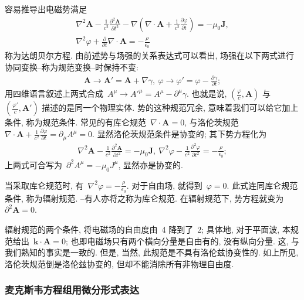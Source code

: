 容易推导出电磁势满足
\begin{gather}
\nabla^2\bm{A}-\frac{1}{c^2}\frac{\partial^2\bm{A}}{\partial t^2}-\nabla\left(\nabla\cdot\bm{A}+\frac{1}{c^2}\frac{\partial\varphi}{\partial t}\right)=-\mu_0\bm{J},\\
\nabla^2\varphi+\frac{\partial}{\partial t}\nabla\cdot\bm{A}=-\frac{\rho}{\epsilon_0}
\end{gather}
称为达朗贝尔方程. 由前述势与场强的关系表达式可以看出, 场强在以下两式进行协同变换--称为规范变换--时保持不变:
\begin{gather}
\bm{A}\rightarrow\bm{A}'=\bm{A}+\nabla\gamma,~\varphi\rightarrow\varphi'=\varphi-\frac{\partial\gamma}{\partial t};
\end{gather}
用四维语言叙述上两式合成~$A^\mu\rightarrow A'^\mu=A^\mu-\partial^\mu\gamma$. 也就是说, $(\frac{\varphi}{c},\bm{A})$ 与~$(\frac{\varphi'}{c},\bm{A}')$ 描述的是同一个物理实体. 势的这种规范冗余, 意味着我们可以给它加上条件, 称为规范条件. 常见的有库仑规范~$\nabla\cdot\bm{A}=0$, 与洛伦茨规范~$\nabla\cdot\bm{A}+\frac{1}{c^2}\frac{\partial\varphi}{\partial t}=\partial_\mu A^\mu=0$. 显然洛伦茨规范条件是协变的; 其下势方程化为
\begin{gather}
\nabla^2\bm{A}-\frac{1}{c^2}\frac{\partial^2\bm{A}}{\partial t^2}=-\mu_0\bm{J},~\nabla^2\varphi-\frac{1}{c^2}\frac{\partial^2\varphi}{\partial t^2}=-\frac{\rho}{\epsilon_0};
\end{gather}
上两式可合写为~$\partial^2 A^\mu=-\mu_0 J^\mu$, 显然亦是协变的.

当采取库仑规范时, 有~$\nabla^2\varphi=-\frac{\rho}{\epsilon_0}$. 对于自由场, 就得到~$\varphi=0$. 此式连同库仑规范条件, 称为辐射规范. --有人亦将之称为库仑规范. 在辐射规范下, 势方程就变为~$\partial^2\bm{A}=0$.

辐射规范的两个条件, 将电磁场的自由度由~4 降到了~2; 具体地, 对于平面波, 本规范给出~$\bm{k}\cdot\bm{A}=0$; 也即电磁场只有两个横向分量是自由有的, 没有纵向分量. 这, 与我们熟知的事实是一致的. 但是, 当然, 此规范是不具有洛伦兹协变性的. 如上所见, 洛伦茨规范倒是洛伦兹协变的, 但却不能消除所有非物理自由度.




\subsubsection{麦克斯韦方程组用微分形式表达}

